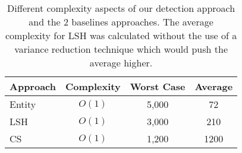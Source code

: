 \begin{table}[h]
	\centering

  \caption[Complexity, theoretical worst case, and average comparisons for different event detection approaches.]{Different complexity aspects of our detection approach and the 2 baselines approaches. The average complexity for LSH was calculated without the use of a variance reduction technique which would push the average higher. }
  \label{detection:table:efficiency}

	\begin{tabulary}{\textwidth}{l c c c }
	  \toprule
	  \textbf{Approach} & \textbf{Complexity} & \textbf{Worst Case} & \textbf{Average}  \\
	  \midrule
		Entity & \(O(1)\) & 5,000 & 72 \\
		LSH & \(O(1)\) & 3,000 & 210 \\
		CS & \(O(1)\) & 1,200 & 1200 \\
	  \bottomrule
	\end{tabulary}

\end{table}